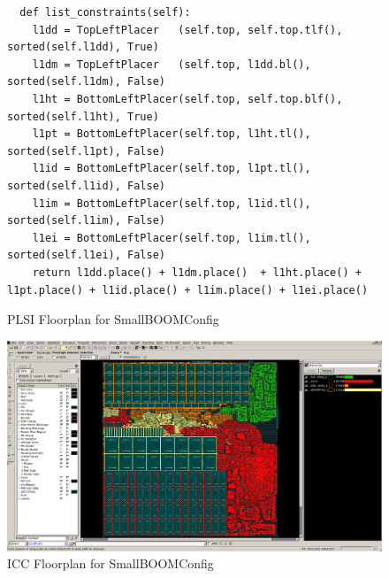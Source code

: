 \documentclass{article}
\begin{document}
\begin{figure}
\begin{verbatim}
  def list_constraints(self):
    l1dd = TopLeftPlacer   (self.top, self.top.tlf(), sorted(self.l1dd), True)
    l1dm = TopLeftPlacer   (self.top, l1dd.bl(),      sorted(self.l1dm), False)
    l1ht = BottomLeftPlacer(self.top, self.top.blf(), sorted(self.l1ht), True)
    l1pt = BottomLeftPlacer(self.top, l1ht.tl(),      sorted(self.l1pt), False)
    l1id = BottomLeftPlacer(self.top, l1pt.tl(),      sorted(self.l1id), False)
    l1im = BottomLeftPlacer(self.top, l1id.tl(),      sorted(self.l1im), False)
    l1ei = BottomLeftPlacer(self.top, l1im.tl(),      sorted(self.l1ei), False)
    return l1dd.place() + l1dm.place()  + l1ht.place() + l1pt.place() + l1id.place() + l1im.place() + l1ei.place()
\end{verbatim}
  \caption{PLSI Floorplan for SmallBOOMConfig}
  \label{res:boom-fppy}
\end{figure}

\begin{figure}
  \begin{center}
    \includegraphics[width=0.95\linewidth]{figures/icc-boom.png}
  \end{center}
  \caption{ICC Floorplan for SmallBOOMConfig}
  \label{res:boom-icc}
\end{figure}
\end{document}

